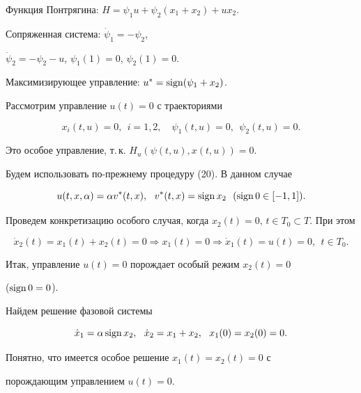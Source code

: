 Функция Понтрягина: $H = \psi_{1} u + \psi_{2}(x_{1} + x_{2}) + u x_{2}$.


Сопряженная система: $\Dot{\psi}_{1} = -\psi_{2}$,


$\Dot{\psi}_{2} = - \psi_{2} - u$, $\psi_{1}(1) = 0$, $\psi_{2}(1)= 0$. 


Максимизирующее управление: $u^{*} = \operatorname{sign} (\psi_{1} + x_{2})$.





Рассмотрим управление $u(t) = 0$ с траекториями


$$


x_{i}(t, u) = 0,\ \ i = 1, 2,\quad


\psi_{1}(t, u) = 0,\ \ \psi_{2}(t, u) = 0.


$$


Это особое управление, т.\,к. $H_{u}(\psi(t, u), x(t, u)) = 0$.





Будем использовать по-прежнему процедуру (20). В данном случае


$$


u(t, x, \alpha) = \alpha v^{*}(t, x),\ \ 


v^{*}(t, x) = \sign x_{2}\ \ (\sign 0 \in [-1, 1]).


$$


Проведем конкретизацию особого случая, когда $x_{2}(t) = 0$, $t \in


T_{0} \subset T$. При этом


$$


\Dot{x}_{2}(t) = x_{1}(t) + x_{2}(t) = 0 \Rightarrow x_{1}(t) = 0


\Rightarrow \Dot{x}_{1}(t) = u(t) = 0,\ \ t \in T_{0}.


$$


Итак, управление $u(t) = 0$ порождает особый режим $x_{2}(t) =0$


($\operatorname{sign} 0=0$).





Найдем решение фазовой системы


$$


\Dot{x}_{1} = \alpha\sign x_{2},\ \ \Dot{x}_{2} = x_{1} + x_{2},


\ \ x_{1}(0) = x_{2}(0) = 0.


$$


Понятно, что имеется особое решение $x_{1}(t) = x_{2}(t) = 0$ с


порождающим управлением $u(t) = 0$.





